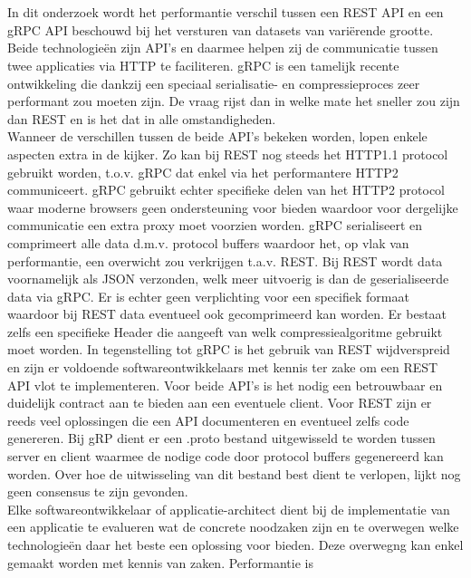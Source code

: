 \chapter*{}
In dit onderzoek wordt het performantie verschil tussen een REST API en een gRPC API beschouwd bij het versturen van datasets van vari\"erende grootte.
Beide technologie\"en zijn API's en daarmee helpen zij de communicatie tussen twee applicaties via HTTP te faciliteren. gRPC is een tamelijk recente ontwikkeling die
dankzij een speciaal serialisatie- en compressieproces zeer performant zou moeten zijn. De vraag rijst dan in welke mate het sneller zou zijn dan REST en is het dat
in alle omstandigheden.\\
Wanneer de verschillen tussen de beide API's bekeken worden, lopen enkele aspecten extra in de kijker.
Zo kan bij REST nog steeds het HTTP1.1 protocol gebruikt worden, t.o.v. gRPC dat enkel via het performantere HTTP2 communiceert.
gRPC gebruikt echter specifieke delen van het HTTP2 protocol waar moderne browsers geen ondersteuning voor bieden
waardoor voor dergelijke communicatie een extra proxy moet voorzien worden.
gRPC serialiseert en comprimeert alle data d.m.v. protocol buffers waardoor het, op vlak van performantie, een overwicht zou verkrijgen t.a.v. REST.
Bij REST wordt data voornamelijk als JSON verzonden, welk meer uitvoerig is dan de geserialiseerde data via gRPC.
Er is echter geen verplichting voor een specifiek formaat waardoor bij REST data eventueel ook gecomprimeerd kan worden.
Er bestaat zelfs een specifieke Header die aangeeft van welk compressiealgoritme gebruikt moet worden.
In tegenstelling tot gRPC is het gebruik van REST wijdverspreid en zijn er voldoende softwareontwikkelaars met kennis ter zake om een REST API vlot te implementeren.
Voor beide API's is het nodig een betrouwbaar en duidelijk contract aan te bieden aan een eventuele client.
Voor REST zijn er reeds veel oplossingen die een API documenteren en eventueel zelfs code genereren.
Bij gRP dient er een .proto bestand uitgewisseld te worden tussen server en client waarmee de nodige code door protocol buffers gegenereerd kan worden.
Over hoe de uitwisseling van dit bestand best dient te verlopen, lijkt nog geen consensus te zijn gevonden.\\
Elke softwareontwikkelaar of applicatie-architect dient bij de implementatie van een applicatie te evalueren wat de concrete noodzaken
zijn en te overwegen welke technologie\"en daar het beste een oplossing voor bieden. Deze overwegng kan enkel gemaakt worden met kennis van zaken. Performantie is
